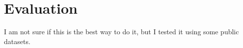 \section{Evaluation}
\label{sec:evaluation}

I am not sure if this is the best way to do it, but I tested it using some
public datasets.
